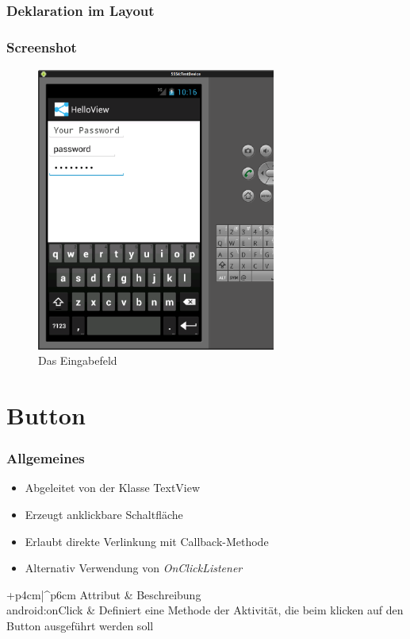 \begin{frame}
   \frametitle{Deklaration im Layout}
	
\end{frame}

\begin{frame}
   \frametitle{Screenshot}
	\begin{figure}[h!]
	  \centering
	  \includegraphics[width=0.7\textwidth]{pictures/edittext.ps}
	  \caption{
		  Das Eingabefeld
	  }
	  \label{fig:edittext}
	\end{figure}
\end{frame}

\section{Button}
\begin{frame}
   \frametitle{Allgemeines}
   \begin{itemize}
      \item Abgeleitet von der Klasse TextView
      \item Erzeugt anklickbare Schaltfläche
      \item Erlaubt direkte Verlinkung mit Callback-Methode
      \item Alternativ Verwendung von \emph{OnClickListener}
   \end{itemize}

	\begin{attrDesc}{+p{4cm}|^p{6cm}}
		Attribut & Beschreibung\\
		\hline
		android:onClick & Definiert eine Methode der Aktivität, die beim 
			klicken auf den Button ausgeführt werden soll\\
	\end{attrDesc}
\end{frame}

